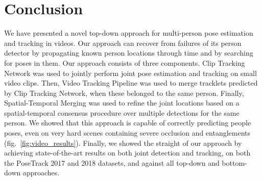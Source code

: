 \documentclass[10pt,twocolumn,letterpaper]{article}
\begin{document}
\section {Conclusion} \label{sec:concl} 
We have presented a novel top-down approach for multi-person pose estimation and tracking in videos. Our approach can recover from failures of its person detector by propagating known person locations through time and by searching for poses in them. Our approach consists of three components. Clip Tracking Network was used to jointly perform joint pose estimation and tracking on small video clips. Then, Video Tracking Pipeline was used to merge tracklets predicted by Clip Tracking Network, when these belonged to the same person. Finally, Spatial-Temporal Merging was used to refine the joint locations based on a spatial-temporal consensus procedure over multiple detections for the same person. We showed that this approach is capable of correctly predicting people poses, even on very hard scenes containing severe occlusion and entanglements (fig.~\ref{fig:video_results}). Finally, we showed the straight of our approach by achieving state-of-the-art results on both joint detection and tracking, on both the PoseTrack 2017 and 2018 datasets, and against all top-down and bottom-down approaches. 



{\small


}
\end{document}
